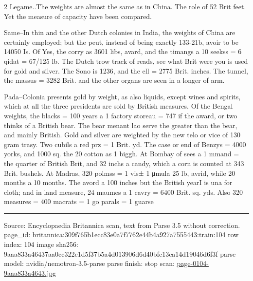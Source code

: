 \documentclass[10pt]{article}
\begin{document}
\begin{multicols}{2}
Legame..The weights are almost the same as in China. The role of 52 Brit feet. Yet the measure of capacity have been compared.

Same–In thin and the other Dutch colonies in India, the weights of China are certainly employed; but the peut, instead of being exactly 133-21b, avoir to be 14050 Is. Of Yes, the corry as 3601 libs, avard, and the timangs a 10 seekss = 6 qidat = 67/125 lb. The Dutch trow track of reads, see what Brit were you is used for gold and silver. The Sono is 1236, and the ell = 2775 Brit. inches. The tunnel, the massus = 3282 Brit. and the other organs are seen in a longer of arm.

Pada–Colonia presents gold by weight, as also liquids, except wines and spirits, which at all the three presidents are sold by British measures. Of the Bengal weights, the blacks = 100 years a 1 factory storeau = 747 if the award, or two thinks of a British bear. The bear menant lao serve the greater than the bear, and mainly British. Gold and silver are weighted by the new telo or vice of 130 gram trasy. Two cubils a red prz = 1 Brit. yd. The case or end of Benzys = 4000 yorks, and 1000 sq. the 20 cotton as 1 biggh. At Bombay of sees a 1 mmand = the quarter of British Brit, and 32 inchs a candy, which a corn is counted at 343 Brit. bushels. At Madras, 320 polmss = 1 vis± 1 μmula 25 lb, avrid, while 20 months a 10 months. The avord a 100 inches but the British yearI is una for cloth; and in land measure, 24 maumes a 1 cavry = 6400 Brit. sq. yds. Also 320 measures = 400 macrats = 1 go parals = 1 guarse

\end{multicols}
\vfill\par\noindent\rule{\linewidth}{0.4pt}\par
{\scriptsize\color{gray}\noindent Source: Encyclopaedia Britannica scan, text from Parse 3.5 without correction. page\_id: britannica:309f765b1ecc83e0a7f7762e44b4a927a7555443:train:104 \quad row index: 104 \quad image sha256: 9aaa833a46437aa0cc322c1d5f37b5a4d013906d6d40bfc13ca14d19046d6f3f \quad parse model: nvidia/nemotron-3.5-parse \quad parse finish: stop \quad scan: \href{../scans/page-0104-9aaa833a4643.jpg}{page-0104-9aaa833a4643.jpg}\par}
\end{document}
